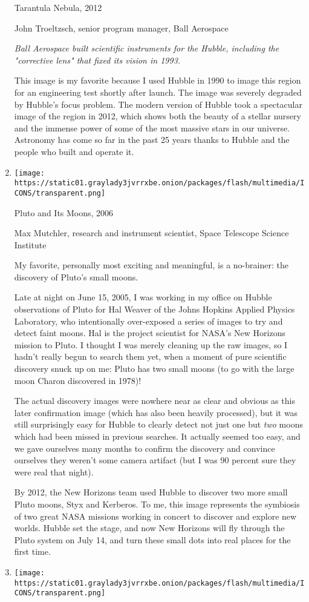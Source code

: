 \begin{enumerate}
  Tarantula Nebula, 2012

  John Troeltzsch, senior program manager, Ball Aerospace

  \emph{Ball Aerospace built scientific instruments for the Hubble,
  including the "corrective lens" that fixed its vision in 1993.}

  This image is my favorite because I used Hubble in 1990 to image this
  region for an engineering test shortly after launch. The image was
  severely degraded by Hubble's focus problem. The modern version of
  Hubble took a spectacular image of the region in 2012, which shows
  both the beauty of a stellar nursery and the immense power of some of
  the most massive stars in our universe. Astronomy has come so far in
  the past 25 years thanks to Hubble and the people who built and
  operate it.
\item
  \texttt{[image: https://static01.graylady3jvrrxbe.onion/packages/flash/multimedia/ICONS/transparent.png]}

  Pluto and Its Moons, 2006

  Max Mutchler, research and instrument scientist, Space Telescope
  Science Institute

  My favorite, personally most exciting and meaningful, is a no-brainer:
  the discovery of Pluto's small moons.

  Late at night on June 15, 2005, I was working in my office on Hubble
  observations of Pluto for Hal Weaver of the Johns Hopkins Applied
  Physics Laboratory, who intentionally over-exposed a series of images
  to try and detect faint moons. Hal is the project scientist for NASA's
  New Horizons mission to Pluto. I thought I was merely cleaning up the
  raw images, so I hadn't really begun to search them yet, when a moment
  of pure scientific discovery snuck up on me: Pluto has two small moons
  (to go with the large moon Charon discovered in 1978)!

  The actual discovery images were nowhere near as clear and obvious as
  this later confirmation image (which has also been heavily processed),
  but it was still surprisingly easy for Hubble to clearly detect not
  just one but \emph{two} moons which had been missed in previous
  searches. It actually seemed too easy, and we gave ourselves many
  months to confirm the discovery and convince ourselves they weren't
  some camera artifact (but I was 90 percent sure they were real that
  night).

  By 2012, the New Horizons team used Hubble to discover two more small
  Pluto moons, Styx and Kerberos. To me, this image represents the
  symbiosis of two great NASA missions working in concert to discover
  and explore new worlds. Hubble set the stage, and now New Horizons
  will fly through the Pluto system on July 14, and turn these small
  dots into real places for the first time.
\item
  \texttt{[image: https://static01.graylady3jvrrxbe.onion/packages/flash/multimedia/ICONS/transparent.png]}


\end{enumerate}
